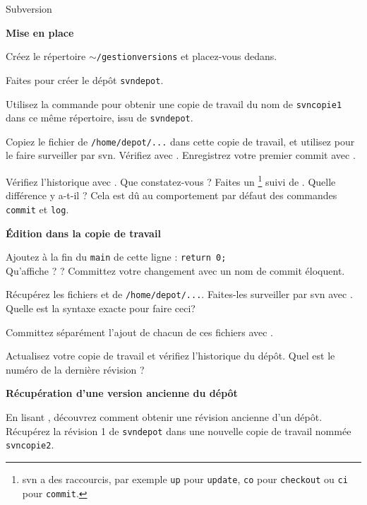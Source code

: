 \documentclass[10pt]{article}\usepackage[nu]{esial}
\begin{document}
\begin{part}{Subversion}
\begin{Exercice} \textbf{Mise en place}

Créez le répertoire {\tt $\sim$/gestionversions} et placez-vous dedans.

Faites  pour créer le dépôt {\tt svndepot}.

Utilisez la commande  pour obtenir une copie de travail
du nom de {\tt svncopie1} dans ce même répertoire, issu de {\tt svndepot}.

Copiez le fichier  de {\tt /home/depot/...} dans cette copie de travail,
et utilisez  pour le faire surveiller par svn. Vérifiez avec .
Enregistrez votre premier commit avec .

Vérifiez l'historique avec . Que constatez-vous ?
Faites un 
\footnote{svn a des raccourcis, par exemple
{\tt up} pour {\tt update}, {\tt co} pour {\tt checkout} ou {\tt ci} pour {\tt commit}.}
suivi de . Quelle différence y a-t-il ?
Cela est dû au comportement par défaut des commandes {\tt commit} et {\tt log}.
\end{Exercice}

\begin{Exercice} \textbf{Édition dans la copie de travail}

Ajoutez à la fin du {\tt main} de  cette ligne : {\tt return 0;}\\

Qu'affiche  ?  ?
Committez votre changement avec un nom de commit éloquent.

Récupérez les fichiers  et  de {\tt /home/depot/...}.
Faites-les surveiller par svn avec .
Quelle est la syntaxe exacte pour faire ceci?

Committez séparément l'ajout de chacun de ces fichiers
avec .

Actualisez votre copie de travail et
vérifiez l'historique du dépôt. Quel est le numéro de la dernière révision ?
\end{Exercice}


\begin{Exercice} \textbf{Récupération d'une version ancienne du dépôt} 

En lisant , découvrez comment obtenir une révision
ancienne d'un dépôt. Récupérez la révision 1 de {\tt svndepot}
dans une nouvelle copie de travail nommée {\tt svncopie2}.


\end{Exercice}
\end{part}
\end{document}

